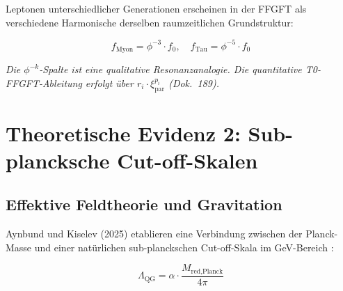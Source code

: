 	Leptonen unterschiedlicher Generationen erscheinen in der FFGFT als verschiedene Harmonische derselben raumzeitlichen Grundstruktur:
	
	\begin{equation}
		 f_{\text{Myon}} = \phi^{-3} \cdot f_0, \quad f_{\text{Tau}} = \phi^{-5} \cdot f_0
	\end{equation}

	\begin{table}[h]
		\centering
		\caption{Leptonen als Resonanzen -- qualitative Analogie und T0-FFGFT-Werte (Dok.~189)}
		{\footnotesize{}} %
		\begin{center}{\small\textit{Die $\phi^{-k}$-Spalte ist eine qualitative Resonanzanalogie.
			Die quantitative T0-FFGFT-Ableitung erfolgt über $r_i\cdot\xi_{\text{par}}^{p_i}$ (Dok.~189).}}
		\end{center}
	\end{table}
	
	\section{Theoretische Evidenz 2: Sub-plancksche Cut-off-Skalen}
	
	\subsection{Effektive Feldtheorie und Gravitation}
	
	Aynbund und Kiselev (2025) etablieren eine Verbindung zwischen der Planck-Masse und einer natürlichen sub-planckschen Cut-off-Skala im GeV-Bereich \cite{Aynbund2025}:
	
	\begin{equation}
		\Lambda_{\text{QG}} = \alpha \cdot \frac{M_{\text{red,Planck}}}{4\pi}
	\end{equation}
	
